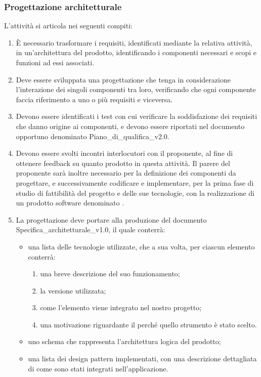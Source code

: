 \subsubsection{Progettazione architetturale}
L'attività si articola nei seguenti compiti:
\begin{enumerate}
    \item È necessario trasformare i requisiti, identificati mediante la relativa attività, in un'architettura del prodotto, identificando i componenti necessari e scopi e funzioni ad essi associati.
    \item Deve essere sviluppata una progettazione che tenga in considerazione l'interazione dei singoli componenti tra loro, verificando che ogni componente faccia riferimento a uno o più requisiti e viceversa.
    \item Devono essere identificati i test con cui verificare la soddisfazione dei requisiti che danno origine ai componenti, e devono essere riportati nel documento opportuno denominato Piano\_di\_qualifica\_v2.0.
    \item Devono essere svolti incontri interlocutori con il proponente, al fine di ottenere feedback su quanto prodotto in questa attività. Il parere del proponente sarà inoltre necessario per la definizione dei componenti da progettare, e successivamente codificare e implementare, per la prima fase di studio di fattibilità del progetto e delle sue tecnologie, con la realizzazione di un prodotto software denominato .
    \item La progettazione deve portare alla produzione del documento Specifica\_architetturale\_v1.0, il quale conterrà:

\begin{itemize}
    \item una lista delle tecnologie utilizzate, che a sua volta, per ciascun elemento conterrà:
    \begin{enumerate}
        \item una breve descrizione del suo funzionamento;
        \item la versione utilizzata;
        \item come l'elemento viene integrato nel nostro progetto;
        \item una motivazione riguardante il perché quello strumento è stato scelto.
    \end{enumerate}
    \item uno schema che rappresenta l'architettura logica del prodotto;
    \item una lista dei design pattern implementati, con una descrizione dettagliata di come sono stati integrati nell'applicazione.
\end{itemize}
\end{enumerate}

